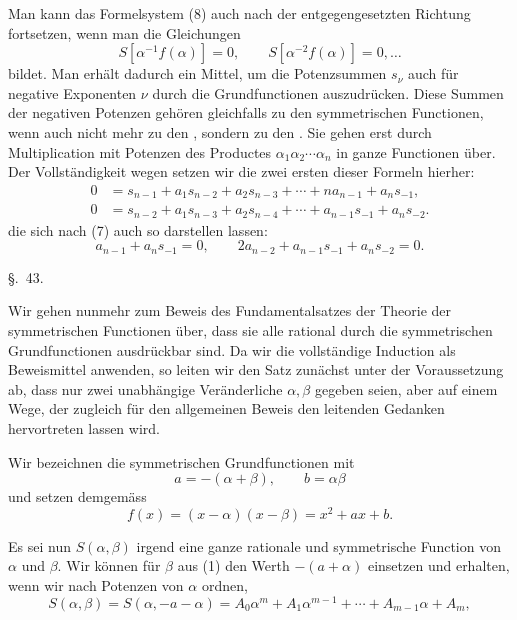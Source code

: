 
Man kann das Formelsystem (8) auch nach der entgegengesetzten Richtung fortsetzen, wenn man die Gleichungen
\[
 S[\alpha^{-1}f(\alpha)]=0,\qquad
 S[\alpha^{-2}f(\alpha)]=0,\ldots
\]
bildet. Man erhält dadurch ein Mittel, um die Potenzsummen $s_\nu$ auch für negative Exponenten $\nu$ durch die Grundfunctionen auszudrücken. Diese Summen der negativen Potenzen gehören gleichfalls zu den symmetrischen Functionen, wenn auch nicht mehr zu den , sondern zu den . Sie gehen erst durch Multiplication mit Potenzen des Productes $\alpha_1\alpha_2\cdots\alpha_n$ in ganze Functionen über. Der Vollständigkeit wegen setzen wir die zwei ersten dieser Formeln hierher:
\begin{equation}
\begin{aligned}
0&=s_{n-1}+a_1s_{n-2}+a_2s_{n-3}+\cdots+na_{n-1}+a_ns_{-1},\\
0&=s_{n-2}+a_1s_{n-3}+a_2s_{n-4}+\cdots+a_{n-1}s_{-1}+a_ns_{-2}.
\end{aligned}
\tag{11}
\end{equation}
die sich nach (7) auch so darstellen lassen:
\[
 a_{n-1}+a_ns_{-1}=0,\qquad 2a_{n-2}+a_{n-1}s_{-1}+a_ns_{-2}=0.
\]

\begin{center}
{\large \S.\ 43.}

\vspace{0.5em}
{\large{}}
\end{center}

Wir gehen nunmehr zum Beweis des Fundamentalsatzes der Theorie der symmetrischen Functionen über, dass sie alle rational durch die symmetrischen Grundfunctionen ausdrückbar sind. Da wir die vollständige Induction als Beweismittel anwenden, so leiten wir den Satz zunächst unter der Voraussetzung ab, dass nur zwei unabhängige Veränderliche $\alpha,\beta$ gegeben seien, aber auf einem Wege, der zugleich für den allgemeinen Beweis den leitenden Gedanken hervortreten lassen wird.

Wir bezeichnen die symmetrischen Grundfunctionen mit
\begin{equation}
 a=-(\alpha+\beta),\qquad b=\alpha\beta
\tag{1}
\end{equation}
und setzen demgemäss
\begin{equation}
 f(x)=(x-\alpha)(x-\beta)=x^2+ax+b.
\tag{2}
\end{equation}

Es sei nun $S(\alpha,\beta)$ irgend eine ganze rationale und symmetrische Function von $\alpha$ und $\beta$. Wir können für $\beta$ aus (1) den Werth $-(a+\alpha)$ einsetzen und erhalten, wenn wir nach Potenzen von $\alpha$ ordnen,
\begin{equation}
 S(\alpha,\beta)=S(\alpha,-a-\alpha)=A_0\alpha^m+A_1\alpha^{m-1}+\cdots+A_{m-1}\alpha+A_m,
\tag{3}
\end{equation}
